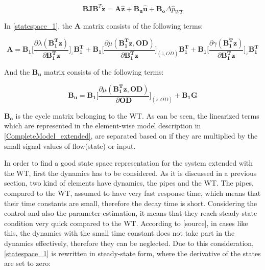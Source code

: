 \begin{equation}
 \pmb{B}\pmb{J {B}}^T \pmb{\dot{z}} = \pmb{A} \pmb{\hat{z}} + \pmb{B_u} \pmb{\hat{u}} + \pmb{B_o} \Delta \hat{p}_{WT}    
 \label{statespace_1}
\end{equation}

In \eqref{statespace_1}, the $\pmb{A}$ matrix consists of the following terms: 

\begin{equation}
  \pmb{A} = \pmb{B_1} \bigg[ \frac{\partial{\lambda(\pmb{{B_1^{T}}}\pmb{z})}}{{\partial{\pmb{{B_1^{T}}}\pmb{z}}}}   \bigg]_{\bar{z}} \pmb{{B_1^{T}}} +  \pmb{B_1} \bigg[ \frac{\partial{\mu(\pmb{{B_1^{T}}}\pmb{z}, \pmb{OD})}}{{\partial{\pmb{{B_1^{T}}}\pmb{z}}}}  \bigg]_{(\bar{z}, \bar{OD})} \pmb{{B_1^{T}}} +  \pmb{B_1} \bigg[ \frac{\partial{\gamma(\pmb{{B_1^{T}}}\pmb{z})}}{{\partial{\pmb{{B_1^{T}}}\pmb{z}}}}   \bigg]_{\bar{z}} \pmb{{B_1^{T}}}
\label{Amatrix}
\end{equation}

And the $\pmb{B_u}$ matrix consists of the following terms:

\begin{equation}
  \pmb{B_u} = \pmb{B_1} \bigg[ \frac{\partial{\mu(\pmb{{B_1^{T}}}\pmb{z}, \pmb{OD})}}{{\partial{\pmb{OD}}}}  \bigg]_{(\bar{z}, \bar{OD})} + \pmb{B_1}\pmb{G}  
\label{Bumatrix}
\end{equation}

$\pmb{B_o}$ is the cycle matrix belonging to the WT. As can be seen, the linearized terms which are represented in the element-wise model description in \eqref{CompleteModel_extended}, are separated based on if they are multiplied by the small signal values of flow(state) or input. 

In order to find a good state space representation for the system extended with the WT, first the dynamics has to be considered. As it is discussed in a previous section, two kind of elements have dynamics, the pipes and the WT. The pipes, compared to the WT, assumed to have very fast response time, which means that their time constants are small, therefore the decay time is short. Considering the control and also the parameter estimation, it means that they reach steady-state condition very quick compared to the WT. According to [source], in cases like this, the dynamics with the small time constant does not take part in the dynamics effectively, therefore they can be neglected. Due to this consideration, \eqref{statespace_1} is rewritten in steady-state form, where the derivative of the states are set to zero:

